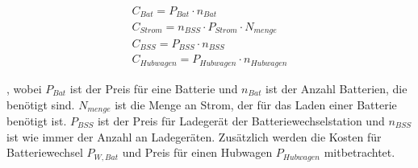 \begin{equation}
   \begin{split}
  {C_{Bat}} = P_{Bat} \cdot n_{Bat}\\
  {C_{Strom}} = n_{BSS} \cdot P_{Strom} \cdot N_{menge}\\
  {C_{BSS}} = P_{BSS} \cdot n_{BSS} \\
  {C_{Hubwagen}} = P_{Hubwagen} \cdot n_{Hubwagen}
  \label{BA}
   \end{split}
  \end{equation}

, wobei $P_{Bat}$ ist der Preis für eine Batterie und $n_{Bat}$ ist der Anzahl Batterien, die benötigt sind.
$N_{menge}$ ist die Menge an Strom, der für das Laden einer Batterie benötigt ist.
$P_{BSS}$ ist der Preis für Ladegerät der Batteriewechselstation und $n_{BSS}$ ist wie immer der Anzahl an Ladegeräten. 
Zusätzlich werden die Kosten für
Batteriewechsel $P_{W,Bat}$ und Preis für einen Hubwagen $P_{Hubwagen}$ mitbetrachtet.
  






